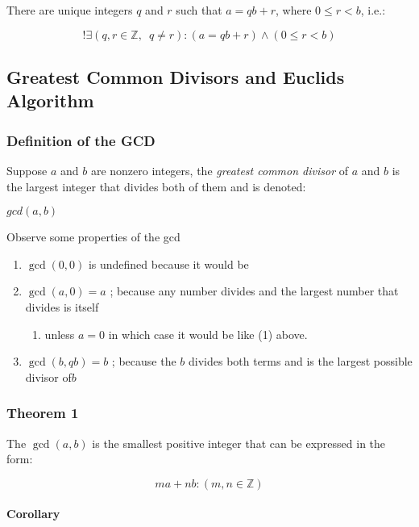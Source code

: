 \documentclass[
]{article}
\begin{document}
There are unique integers \(q\) and \(r\) such that \(a = qb +r\), where
\(0 \leq r <b\), i.e.:

\[!\exists (q,r \in \mathbb{Z}, \enspace q \neq r)  : (a = qb +r) \wedge (0 \leq r < b)\]

\hypertarget{header-n105}{%
\subsection{Greatest Common Divisors and Euclids
Algorithm}\label{header-n105}}

\hypertarget{header-n106}{%
\subsubsection{Definition of the GCD}\label{header-n106}}

Suppose \(a\) and \(b\) are nonzero integers, the \emph{greatest common
divisor} of \(a\) and \(b\) is the largest integer that divides both of
them and is denoted:

\(gcd(a,b)\)

Observe some properties of the gcd

\begin{enumerate}
\def\labelenumi{\arabic{enumi}.}
\item
  \(\gcd(0,0)\) is undefined because it would be 
\item
  \(\gcd(a,0) = a\) ; because any number divides and the largest number
  that divides is itself

  \begin{enumerate}
  \def\labelenumii{\arabic{enumii}.}
  \item
    unless \(a=0\) in which case it would be like (1) above.
  \end{enumerate}
\item
  \(\gcd(b, qb) = b\) ; because the \(b\) divides both terms and is the
  largest possible divisor of\(b\)
\end{enumerate}

\hypertarget{header-n120}{%
\subsubsection{Theorem 1}\label{header-n120}}

The \(\gcd(a,b)\) is the smallest positive integer that can be expressed
in the form:

\[ma + nb : (m,n \in \mathbb{Z})\]

\hypertarget{header-n123}{%
\paragraph{Corollary}\label{header-n123}}
\end{document}
